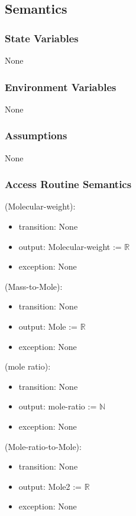 \documentclass[12pt, titlepage]{article}
\begin{document}
\subsection{Semantics}

\subsubsection{State Variables}

None


\subsubsection{Environment Variables}

None

\subsubsection{Assumptions}

None

\subsubsection{Access Routine Semantics}

\noindent (Molecular-weight):
\begin{itemize}
\item transition: None
\item output: Molecular-weight :=  $\mathbb{R}$ 
\item exception: None 
\end{itemize}

\noindent (Mass-to-Mole):
\begin{itemize}
\item transition: None
\item output: Mole := $\mathbb{R}$ 
\item exception: None 
\end{itemize}

\noindent (mole ratio):
\begin{itemize}
\item transition: None
\item output: mole-ratio := $\mathbb{N}$ 
\item exception: None 
\end{itemize}

\noindent (Mole-ratio-to-Mole):
\begin{itemize}
\item transition: None
\item output: Mole2 := $\mathbb{R}$
\item exception: None 
\end{itemize}
\end{document}
